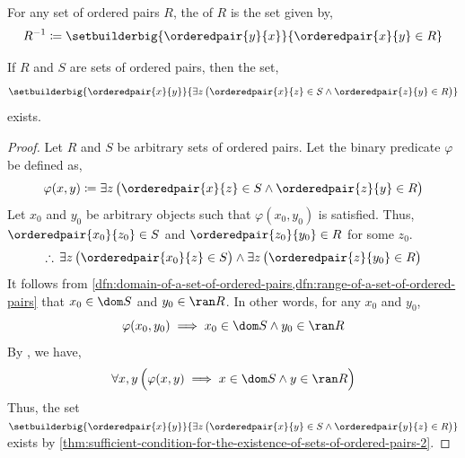 \begin{dfn}[Inverse]
    \label{dfn:inverse-of-a-set-of-ordered-pairs}
    For any set of ordered pairs \( R \), the  of \( R \) is the set given by,
    \begin{equation*}
        R^{-1} \coloneq \setbuilderbig{\orderedpair{y}{x}}{\orderedpair{x}{y} \in R}
    \end{equation*}
\end{dfn}

\begin{thm}
    \label{thm:existence-of-the-composition-of-two-sets-of-ordered-pairs}
    If \( R \) and \( S \) are sets of ordered pairs, then the set,
    \begin{equation*}
        \setbuilderbig{\orderedpair{x}{y}}{\exists z \, \big( \orderedpair{x}{z} \in S \land \orderedpair{z}{y} \in R \big)}
    \end{equation*}
    exists.
\end{thm}

\begin{proof}
    Let \( R \) and \( S \) be arbitrary sets of ordered pairs. Let the binary predicate \( \varphi \) be defined as,
    \begin{equation*}
        \varphi(x,y) \coloneq \exists z \, \big( \orderedpair{x}{z} \in S \land \orderedpair{z}{y} \in R \big)
    \end{equation*}
    Let \( x_{0} \) and \( y_{0} \) be arbitrary objects such that \( \varphi(x_{0}, y_{0}) \) is satisfied. Thus,
    \( \orderedpair{x_{0}}{z_{0}} \in S \) and \( \orderedpair{z_{0}}{y_{0}} \in R \) for some \( z_{0} \).
    \begin{equation*}
        \therefore \, \exists z \, \big( \orderedpair{x_{0}}{z} \in S \big) \land \exists z \, \big( \orderedpair{z}{y_{0}} \in R \big)
    \end{equation*}
    It follows from \cref{dfn:domain-of-a-set-of-ordered-pairs,dfn:range-of-a-set-of-ordered-pairs} that
    \( x_{0} \in \dom S \) and \( y_{0} \in \ran R \). In other words, for any \( x_{0} \) and \( y_{0} \),
    \begin{equation*}
        \varphi(x_{0}, y_{0}) \implies x_{0} \in \dom S \land y_{0} \in \ran R
    \end{equation*}
    By , we have,
    \begin{equation*}
        \forall x,y \, \Big( \varphi(x,y) \implies x \in \dom S \land y \in \ran R \Big)
    \end{equation*}
    Thus, the set \(\setbuilderbig{\orderedpair{x}{y}}{\exists z \, \big( \orderedpair{x}{y} \in S \land \orderedpair{y}{z} \in R \big)} \)
    exists by \cref{thm:sufficient-condition-for-the-existence-of-sets-of-ordered-pairs-2}.
\end{proof}

